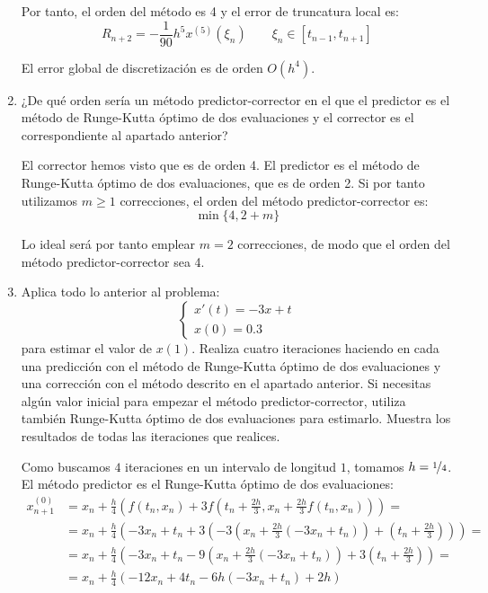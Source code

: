 \begin{ejercicio}
\begin{enumerate}
        Por tanto, el orden del método es 4 y el error de truncatura local es:
        \begin{equation*}
            R_{n+2} = -\frac{1}{90}h^5x^{(5)}(\xi_n) \qquad \xi_n \in [t_{n-1},t_{n+1}]
        \end{equation*}
        
        El error global de discretización es de orden $O(h^4)$.
        \item ¿De qué orden sería un método predictor-corrector en el que el predictor es el método de Runge-Kutta óptimo de dos evaluaciones y el corrector es el correspondiente al apartado anterior?
        
        El corrector hemos visto que es de orden 4. El predictor es el método de Runge-Kutta óptimo de dos evaluaciones, que es de orden 2. Si por tanto utilizamos $m\geq 1$ correcciones, el orden del método predictor-corrector es:
        \begin{equation*}
            \min\{4,2+m\}
        \end{equation*}

        Lo ideal será por tanto emplear $m=2$ correcciones, de modo que el orden del método predictor-corrector sea 4.
        \item Aplica todo lo anterior al problema:
            \begin{equation*}
                \begin{cases}
                    x'(t) = -3x + t \\
                    x(0) = 0.3
                \end{cases}
            \end{equation*}
            para estimar el valor de $x(1)$. Realiza cuatro iteraciones haciendo en cada una predicción con el método de Runge-Kutta óptimo de dos evaluaciones y una corrección con el método descrito en el apartado anterior. Si necesitas algún valor inicial para empezar el método predictor-corrector, utiliza también Runge-Kutta óptimo de dos evaluaciones para estimarlo. Muestra los resultados de todas las iteraciones que realices.

            Como buscamos $4$ iteraciones en un intervalo de longitud $1$, tomamos $h = \nicefrac{1}{4}$. El método predictor es el Runge-Kutta óptimo de dos evaluaciones:
            \begin{align*}
                x_{n+1}^{(0)} &= x_n + \frac{h}{4} \left( f(t_n, x_n) + 3f\left(t_n + \frac{2h}{3}, x_n + \frac{2h}{3}f(t_n, x_n)\right) \right)
                =\\&= x_n + \frac{h}{4} \left( -3x_n + t_n + 3\left(-3\left(x_n + \frac{2h}{3}\left(-3x_n + t_n\right)\right) + \left(t_n + \frac{2h}{3}\right)\right) \right)
                =\\&= x_n + \frac{h}{4} \left( -3x_n + t_n -9\left(x_n + \frac{2h}{3}\left(-3x_n + t_n\right)\right) + 3\left(t_n + \frac{2h}{3}\right) \right)
                =\\&= x_n + \frac{h}{4} \left( -12x_n + 4t_n -6h\left(-3x_n + t_n\right) + 2h \right)
            \end{align*}


\end{enumerate}
\end{ejercicio}
